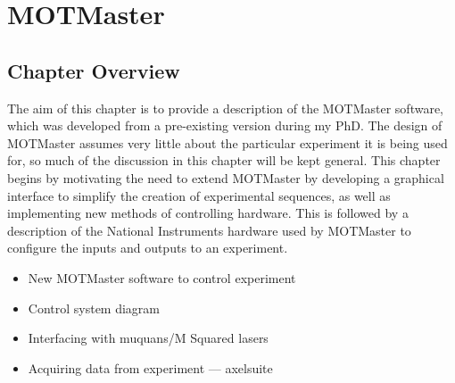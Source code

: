 \chapter{MOTMaster}\label{chap:compinterface}

\section{Chapter Overview}\label{sec:compinterface_overview}
The aim of this chapter is to provide a description of the MOTMaster software, which was developed from a pre-existing version during my PhD. The design of MOTMaster assumes very little about the particular experiment it is being used for, so much of the discussion in this chapter will be kept general. This chapter begins by motivating the need to extend MOTMaster by developing a graphical interface to simplify the creation of experimental sequences, as well as implementing new methods of controlling hardware. This is followed by a description of the National Instruments hardware used by MOTMaster to configure the inputs and outputs to an experiment.
\begin{itemize}
    \item New MOTMaster software to control experiment
    \item Control system diagram
    \item Interfacing with muquans/M Squared lasers
    \item Acquiring data from experiment --- axelsuite
\end{itemize}
